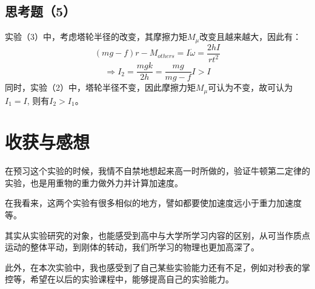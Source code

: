 \documentclass{ctexart}
\begin{document}
      \subsection{思考题（5）}
      实验（3）中，考虑塔轮半径的改变，其摩擦力矩$M_{\mu}$改变且越来越大，因此有：
      $$(mg-f)r-M_{others}=I\dot\omega=\frac{2hI}{rt^2}$$
      $$\Rightarrow I_2=\frac{mgk}{2h}=\frac{mg}{mg-f}I>I$$
      同时，实验（2）中，塔轮半径不变，因此摩擦力矩$M_{\mu}$可认为不变，故可认为$I_1=I$,
      则有$I_2>I_1$。
      \section{收获与感想}
      在预习这个实验的时候，我情不自禁地想起来高一时所做的，验证牛顿第二定律的实验，也是用重物的重力做外力并计算加速度。

      在我看来，这两个实验有很多相似的地方，譬如都要使加速度远小于重力加速度等。

      其实从实验研究的对象，也能感受到高中与大学所学习内容的区别，从可当作质点运动的整体平动，到刚体的转动，我们所学习的物理也更加高深了。

      此外，在本次实验中，我也感受到了自己某些实验能力还有不足，例如对秒表的掌控等，希望在以后的实验课程中，能够提高自己的实验能力。
\end{document}
